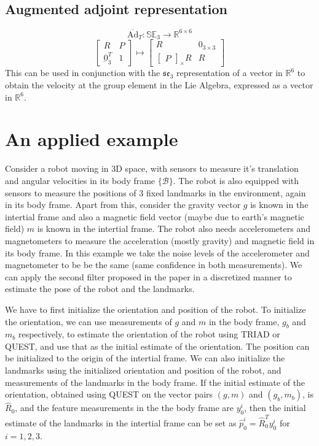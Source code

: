 \documentclass[12pt]{article}
\def\cross#1{\begin{bmatrix} #1 \end{bmatrix}_\times}
\begin{document}
\subsection{Augmented adjoint representation}
\[\overline{\text{Ad}}_T : \mathbb{SE}_3 \rightarrow \mathbb{R}^{6 \times 6}\]
\[ \begin{bmatrix}
    R & P \\
    \underbar{0}_3^T & 1
\end{bmatrix} \mapsto 
\begin{bmatrix}
    R & 0_{3 \times 3} \\ \cross{P}R & R
\end{bmatrix}
\] 
This can be used in conjunction with the $\mathfrak{se}_3$ representation of a vector in $\mathbb{R}^6$ to obtain the velocity at the group element in the Lie Algebra, expressed as a vector in $\mathbb{R}^6$.

\section{An applied example }
Consider a robot moving in 3D space, with sensors to measure it's translation and angular velocities 
in its body frame $\{\mathcal{B}\}$. The robot is also equipped with sensors to measure the positions of 
3 fixed landmarks in the environment, again in its body frame. 
Apart from this, consider the gravity vector $g$ is known in the intertial frame 
and also a magnetic field vector (maybe due to earth's magnetic field) $m$ is known in the intertial frame. 
The robot also needs accelerometers and magnetometers to measure the acceleration (mostly gravity) and magnetic field in its body frame.
In this example we take the noise levels of the accelerometer and magnetometer to be be the same (same confidence in both measurements).
We can apply the second filter proposed in the paper in a discretized manner to estimate the pose of the robot and the landmarks.

We have to first initialize the orientation and position of the robot. To initialize the 
orientation, we can use measurements of $g$ and $m$ in the body frame, $g_b$ and $m_b$ respectively, to estimate the orientation of the robot using TRIAD or QUEST, and use 
that as the initial estimate of the orientation. The position can be initialized to the origin of the intertial frame. We can 
also initialize the landmarks using the initialized orientation and position of the robot, and measurements of the 
landmarks in the body frame. If the initial estimate of the orientation, obtained using QUEST on the
vector pairs $(g, m)$ and $(g_b, m_b)$,  is $\hat R_0$, and the feature measurements in the
the body frame are $y^i_0$, then the initial estimate of the landmarks in the intertial frame can be set as 
$\hat p^i_0 = \hat R_0^T y^i_0$ for $i = 1, 2, 3$.
\end{document}
